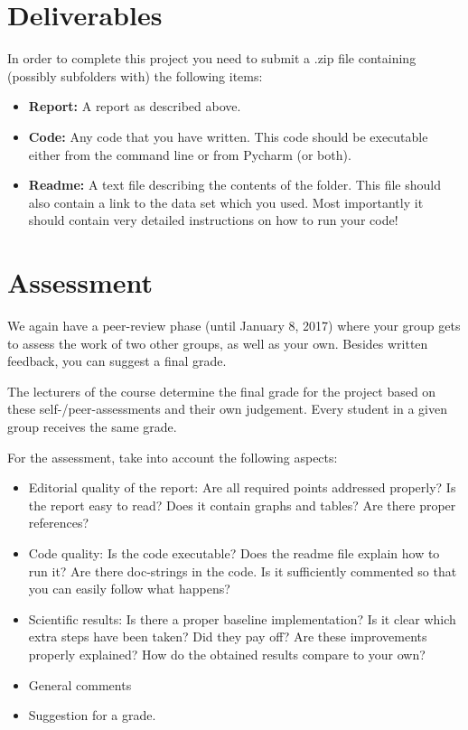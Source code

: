 \documentclass[11pt, leqno, a4paper]{article}
\begin{document}
\section{Deliverables}
In order to complete this project you need to submit a .zip file
containing (possibly subfolders with) the following items:
\begin{itemize}
\item \textbf{Report:} A report as described above.
\item \textbf{Code:} Any code that you have written. This code should be executable either from the command line or from Pycharm (or both).
\item \textbf{Readme:} A text file describing the contents of the folder. This file should also contain a link to the data set which you used. Most importantly
it should contain very detailed instructions on how to run your code!
\end{itemize}

\section{Assessment}
We again have a peer-review phase (until January 8, 2017) where your group gets to assess the
work of two other groups, as well as your own. Besides written
feedback, you can suggest a final grade.

The lecturers of the course determine the final grade for the project based on these
self-/peer-assessments and their own judgement. Every student in a given group
receives the same grade.

For the assessment, take into account the following aspects:
\begin{itemize}
\item Editorial quality of the report: Are all required points addressed
  properly? Is the report easy to read? Does it contain graphs and
  tables? Are there proper references?
\item Code quality: Is the code executable? Does the readme file
  explain how to run it? Are there doc-strings in the code. Is it
  sufficiently commented so that you can easily follow what happens?
\item Scientific results: Is there a proper baseline implementation?
  Is it clear which extra steps have been taken? Did they pay off? Are
  these improvements properly explained? How do the obtained results compare to
  your own?
\item General comments
\item Suggestion for a grade.
\end{itemize}
\end{document}
